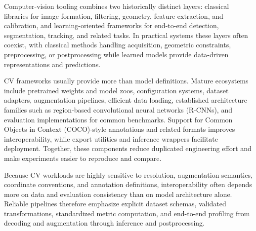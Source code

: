 \documentclass{article}
\begin{document}
Computer-vision tooling combines two historically distinct layers: classical libraries for image formation, filtering, geometry, feature extraction, and calibration, and learning-oriented frameworks for end-to-end detection, segmentation, tracking, and related tasks. In practical systems these layers often coexist, with classical methods handling acquisition, geometric constraints, preprocessing, or postprocessing while learned models provide data-driven representations and predictions.

CV frameworks usually provide more than model definitions. Mature ecosystems include pretrained weights and model zoos, configuration systems, dataset adapters, augmentation pipelines, efficient data loading, established architecture families such as region-based convolutional neural networks (R-CNNs), and evaluation implementations for common benchmarks. Support for Common Objects in Context (COCO)-style annotations and related formats improves interoperability, while export utilities and inference wrappers facilitate deployment. Together, these components reduce duplicated engineering effort and make experiments easier to reproduce and compare.

Because CV workloads are highly sensitive to resolution, augmentation semantics, coordinate conventions, and annotation definitions, interoperability often depends more on data and evaluation consistency than on model architecture alone. Reliable pipelines therefore emphasize explicit dataset schemas, validated transformations, standardized metric computation, and end-to-end profiling from decoding and augmentation through inference and postprocessing.




\clearpage
\end{document}
